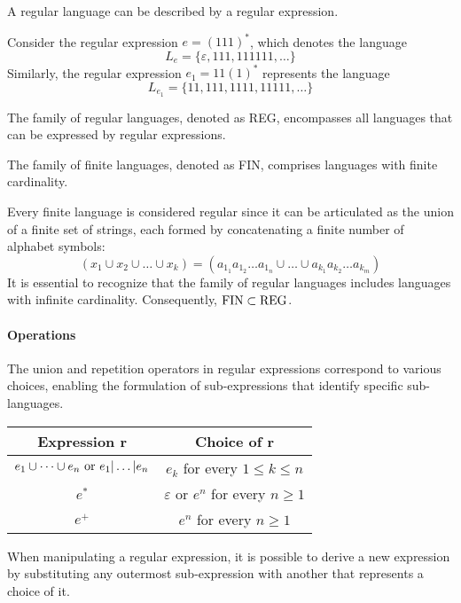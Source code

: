 \begin{definition}
    A regular language can be described by a regular expression.
\end{definition}

\begin{example}
    Consider the regular expression $e=(111)^{*}$, which denotes the language 
    \[L_e=\{\varepsilon,111,111111,\dots\}\]
    Similarly, the regular expression $e_1=11(1)^{*}$ represents the language 
    \[L_{e_1}=\{11,111,1111,11111,\dots\}\]
\end{example}
\begin{definition}
    The family of regular languages, denoted as REG, encompasses all languages that can be expressed by regular expressions.
\end{definition}
\begin{definition}
    The family of finite languages, denoted as FIN, comprises languages with finite cardinality.
\end{definition}
Every finite language is considered regular  since it can be articulated as the union of a finite set of strings, each formed by concatenating a finite number of alphabet symbols:
\[\left(x_1 \cup x_2 \cup \dots \cup x_k \right) = \left( a_{1_1}a_{1_2}\dots a_{1_n} \cup \dots \cup a_{k_1}a_{k_2}\dots a_{k_m} \right)\]
It is essential to recognize that the family of regular languages includes languages with infinite cardinality. 
Consequently, $\textnormal{FIN} \subset \textnormal{REG}$.

\paragraph*{Operations}
The union and repetition operators in regular expressions correspond to various choices, enabling the formulation of sub-expressions that identify specific sub-languages.
\begin{table}[H]
    \centering
    \begin{tabular}{cc}
    \hline
    \textbf{Expression $\boldsymbol{r}$}                                    & \textbf{Choice of $\boldsymbol{r}$}                       \\ \hline
    $e_1 \cup \dots \cup e_n \textnormal{ or } e_1 | \dots | e_n$           & $e_k$ for every $1 \leq k \leq n$                         \\
    $e^{*}$                                                                 & $\varepsilon$ or $e^n$ for every $n \geq 1$               \\
    $e^{+}$                                                                 & $e^n$ for every $n \geq 1$                                \\ \hline
    \end{tabular}
\end{table}
When manipulating a regular expression, it is possible to derive a new expression by substituting any outermost sub-expression with another that represents a choice of it.

